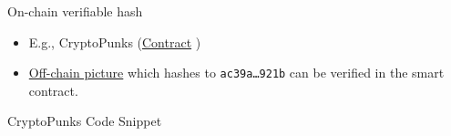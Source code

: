 \documentclass[handout]{beamer}
\begin{document}
\begin{frame}{On-chain verifiable hash}
	\begin{itemize}
		\item E.g., CryptoPunks (\href{https://etherscan.io/address/0xb47e3cd837ddf8e4c57f05d70ab865de6e193bbb}{Contract} \link)
		\item  \href{https://www.larvalabs.com/public/images/cryptopunks/punks.png}{Off-chain picture} \link which hashes to \texttt{\scriptsize ac39a\dots 921b} can be verified in the smart contract.
	\end{itemize}
	\begin{samplecode}{CryptoPunks Code Snippet}
		
	\end{samplecode}
\end{frame}
\end{document}
